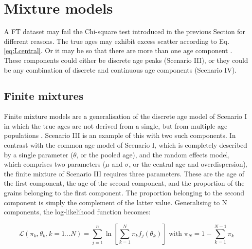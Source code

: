 \documentclass{article}
\begin{document}
\section{Mixture models}
\label{sec:mixtures}

A FT dataset may fail the Chi-square test introduced in the previous
Section for different reasons. The true ages may exhibit excess
scatter according to Eq. \ref{eq:Lcentral}. Or it may be so that there
are more than one age component \citep{galbraith1990b, galbraith1993}.
These components could either be discrete age peaks (Scenario III), or
they could be any combination of discrete and continuous age
components (Scenario IV).

\subsection{Finite mixtures}
\label{sec:finite}

Finite mixture models are a generalisation of the discrete age model
of Scenario I in which the true ages are not derived from a single,
but from multiple age populations \citep{galbraith1990b}. Scenario III
is an example of this with two such components.  In contrast with the
common age model of Scenario I, which is completely described by a
single parameter ($\theta$, or the pooled age), and the random effects
model, which comprises two parameters ($\mu$ and $\sigma$, or the
central age and overdispersion), the finite mixture of Scenario III
requires three parameters. These are the age of the first component,
the age of the second component, and the proportion of the grains
belonging to the first component. The proportion belonging to the
second component is simply the complement of the latter
value. Generalising to N components, the log-likelihood function
becomes:

\begin{equation}
\mathcal{L}(\pi_{k},\theta_{k}, k = 1 \ldots N) = 
\sum\limits_{j=1}^{n} \ln \left[
\sum\limits_{k=1}^{N} \pi_k f_j(\theta_k)
\right]
\mbox{~with~} \pi_N = 1-\sum\limits_{k=1}^{N-1}\pi_k
\label{eq:Lfinite}
\end{equation}
\end{document}
